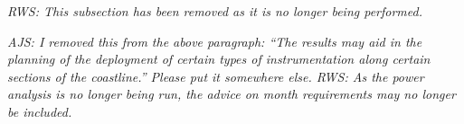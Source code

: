 \documentclass{ametsoc}
\begin{document}


\emph{RWS: This subsection has been removed as it is no longer being performed.}

\emph{AJS: I removed this from the above paragraph: ``The results may aid in the planning of the deployment of certain types of instrumentation along certain sections of the coastline.'' Please put it somewhere else. RWS: As the power analysis is no longer being run, the advice on month requirements may no longer be included.}
\end{document}
